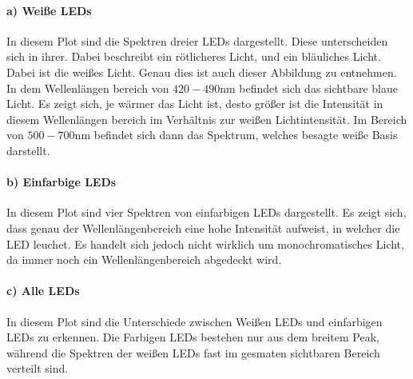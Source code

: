 \paragraph{a) Weiße LEDs}
In diesem Plot sind die Spektren dreier LEDs dargestellt. Diese unterscheiden sich in ihrer. Dabei beschreibt ein rötlicheres Licht, und ein bläuliches Licht. Dabei ist die weißes Licht.
Genau dies ist auch dieser Abbildung zu entnehmen. In dem Wellenlängen bereich von $420-490 \mathrm{nm}$ befindet sich das sichtbare blaue Licht. Es zeigt sich, je wärmer das Licht ist, desto größer ist die Intensität in diesem Wellenlängen bereich im Verhältnis zur weißen Lichtintensität. 
Im Bereich von $500-700 \mathrm{nm}$ befindet sich dann das Spektrum, welches besagte weiße Basis darstellt.

\paragraph{b) Einfarbige LEDs}
In diesem Plot sind vier Spektren von einfarbigen LEDs dargestellt. Es zeigt sich, dass genau der Wellenlängenbereich eine hohe Intensität aufweist, in welcher die LED leuchet. Es handelt sich jedoch nicht wirklich um monochromatisches Licht, da immer noch ein Wellenlängenbereich abgedeckt wird.

\paragraph{c) Alle LEDs}
In diesem Plot sind die Unterschiede zwischen Weißen LEDs und einfarbigen LEDs zu erkennen. Die Farbigen LEDs bestehen nur aus dem breitem Peak, während die Spektren der weißen LEDs fast im gesmaten sichtbaren Bereich verteilt sind.

